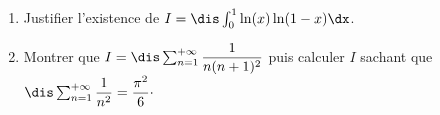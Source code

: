 \documentclass[a4paper,10pt]{report}
\begin{document}
%

\begin{Exercice}{}
\begin{enumerate}
\item Justifier l'existence de $I= \dis \int_{0}^1 \ln(x) \ln(1-x) \dx$.
\item Montrer que $I =\dis \sum_{n=1}^{+ \infty} \dfrac{1}{n(n+1)^2}$ puis calculer $I$ sachant que $\dis \sum_{n=1}^{+ \infty} \dfrac{1}{n^2} = \dfrac{\pi^2}{6}\cdot$
\end{enumerate}
\end{Exercice}
\end{document}
